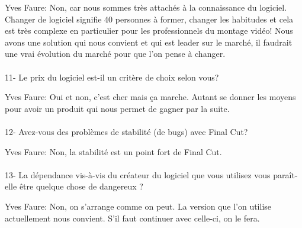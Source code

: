 Yves Faure: Non, car nous sommes très attachés à la connaissance du logiciel.
Changer de logiciel signifie 40 personnes à former, changer les
habitudes et cela est très complexe en particulier pour les professionnels
du montage vidéo! Nous avons une solution qui nous convient et qui est leader
sur le marché, il faudrait une vrai évolution du marché pour que l'on pense à
changer.

\paragraph{}
11-  Le prix du logiciel est-il un critère de choix selon vous?

Yves Faure: Oui et non, c'est cher mais ça marche. Autant se donner les moyens pour avoir
un produit qui nous permet de gagner par la suite.

\paragraph{}
12- Avez-vous des problèmes de stabilité (de bugs) avec Final Cut?

Yves Faure: Non, la stabilité est un point fort de Final Cut.

\paragraph{}
13- La dépendance vis-à-vis du créateur du logiciel que vous utilisez
vous paraît-elle être quelque chose de dangereux ?

Yves Faure: Non, on s'arrange comme on peut. La version que l'on utilise actuellement
nous convient. S'il faut continuer avec celle-ci, on le fera.
